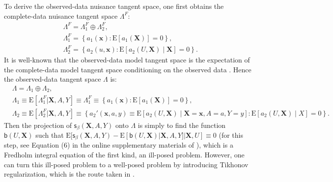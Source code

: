 \documentclass{article}
\def\sfb{\mathsf{b}}
\def\sfb{\mathsf{b}}
\def\bfX{\mathbf{X}}
\def\bfx{\mathbf{x}}
\def\sfs{\mathsf{s}}
\theoremstyle{plain}
\theoremstyle{definition}
\theoremstyle{remark}
\def\E{\mathrm{E}}
\begin{document}
To derive the observed-data nuisance tangent space, one first obtains the complete-data nuisance tangent space $\Lambda^F$:
\begin{equation*}
\begin{aligned}
& \Lambda^F=\Lambda_1^F \oplus \Lambda_2^F, \\
& \Lambda_1^F=\left\{a_1(\bfx): \E\left[a_1(\bfX)\right]=0\right\}, \\
& \Lambda_2^F=\left\{a_2(u, \bfx): \E\left[a_2(U, \bfX) \mid \bfX\right]=0\right\}.
\end{aligned}
\end{equation*}
It is well-known that the observed-data model tangent space is the expectation of the complete-data model tangent space conditioning on the observed data \citep{robins1994estimation, van2003unified}. Hence the observed-data tangent space $\Lambda$ is:
\begin{equation*}
    \begin{split}
        & \Lambda = \Lambda_1 \oplus \Lambda_2,\\
& \Lambda_1 \equiv \E [\Lambda_1^F | \bfX, A, Y] \equiv \Lambda_1^F \equiv \left\{a_1(\bfx): \E\left[a_1(\bfX)\right]=0\right\}, \\
& \Lambda_2 \equiv \E [\Lambda_2^F | \bfX, A, Y] \equiv \left\{a_2' (\bfx, a, y) \equiv \E \left[a_2(U, \bfX) \mid \bfX = \bfx, A = a, Y = y\right]: \E\left[a_2(U, \bfX) \mid X\right]=0\right\}.
    \end{split}
\end{equation*}
Then the projection of $\sfs_{\beta} (\bfX, A, Y)$ onto $\Lambda$ is simply to find the function $\sfb (U, \bfX)$ such that $\E [\sfs_{\beta} (\bfX, A, Y) -  \E [\sfb (U, \bfX) | \bfX, A, Y] | \bfX, U] \equiv 0$ (for this step, see Equation (6) in the online supplementary materials of \citet{zhang2022semi}), which is a Fredholm integral equation of the first kind, an ill-posed problem. However, one can turn this ill-posed problem to a well-posed problem by introducing Tikhonov regularization, which is the route taken in \citet{zhang2022semi}.
\end{document}
